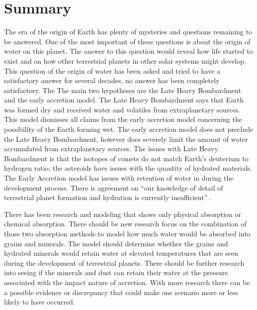 
\section*{Summary}

The era of the origin of Earth has plenty of mysteries and questions remaining to be answered. One of the most important of these questions is about the origin of water on this planet. The answer to this question would reveal how life started to exist and on how other terrestrial planets in other solar systems might develop. This question of the origin of water has been asked and tried to have a satisfactory answer for several decades, no answer has been completely satisfactory. The The main two hypotheses are the Late Heavy Bombardment and the early accretion model. 
The Late Heavy Bombardment says that Earth was formed dry and received water and volatiles from extraplanetary sources. This model dismisses all claims from the early accretion model concerning the possibility of the Earth forming wet. 
The early accretion model does not preclude the Late Heavy Bombardment, however does severely limit the amount of water accumulated from extraplanetary sources. 
The issues with Late Heavy Bombardment is that the isotopes of comets do not match Earth's deuterium to hydrogen ratio; the asteroids have issues with the quantity of hydrated materials. 
The Early Accretion model has issues with retention of water in during the development process.
There is agreement on “our knowledge of detail of terrestrial planet formation and hydration is currently insufficient” \cite{BOMB14}. 

There has been research and modeling that shows only physical absorption or chemical absorption. There should be new research focus on the combination of those two absorption methods to model how much water would be absorbed into grains and minerals. 
The model should determine whether the grains and hydrated minerals would retain water at elevated temperatures that are seen during the development of terrestrial planets.
There should be further research into seeing if the minerals and dust can retain their water at the pressure associated with the impact nature of accretion.
With more research there can be a possible evidence or discrepancy that could make one scenario more or less likely to have occurred.
